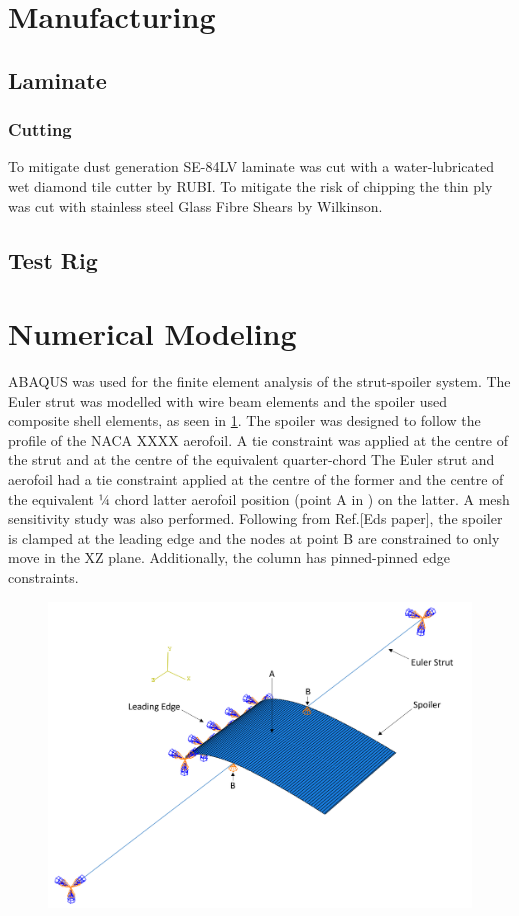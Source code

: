 \documentclass{IEEEtran}
\begin{document}
		
	\section{Manufacturing}
    \subsection{Laminate}
    \subsubsection{Cutting}
    To mitigate dust generation SE-84LV laminate was cut with a water-lubricated wet diamond tile cutter by RUBI. To mitigate the risk of chipping the thin ply was cut with stainless steel Glass Fibre Shears by Wilkinson.
    \subsection{Test Rig}

    \section{Numerical Modeling}
    ABAQUS was used for the finite element analysis of the strut-spoiler system. The Euler strut was modelled with wire beam elements and the spoiler used composite shell elements, as seen in \cref{fig:ModelAssem}. The spoiler was designed to follow the profile of the NACA XXXX aerofoil. 
    A tie constraint was applied at the centre of the strut and at the centre of the equivalent quarter-chord
    The Euler strut and aerofoil had a tie constraint applied at the centre of the former and the centre of the equivalent ¼ chord latter aerofoil position (point A in ) on the latter. A mesh sensitivity study was also performed. Following from Ref.[Eds paper], the spoiler is clamped at the leading edge and the nodes at point B are constrained to only move in the XZ plane. Additionally, the column has pinned-pinned edge constraints. 


    \begin{figure}[H]
        \centering
        \includegraphics[scale=0.4]{ModellingImages/ModelAssem.png}
        \caption{}
        \label{fig:ModelAssem}
    \end{figure}
	
\end{document}
